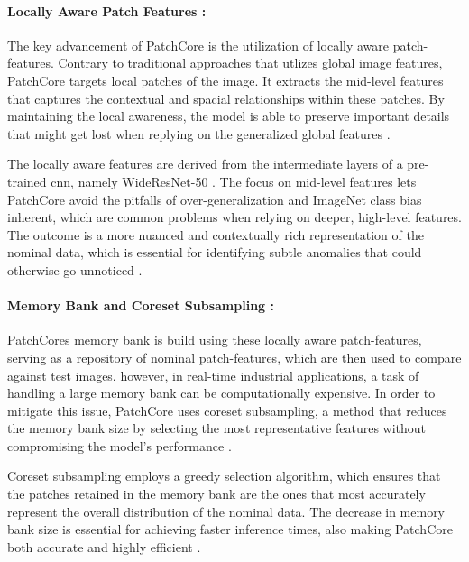 \paragraph*{Locally Aware Patch Features :} 
The key advancement of PatchCore is the utilization of locally aware patch-features. Contrary to traditional approaches that utlizes global image features, PatchCore targets local patches of the image. It extracts the mid-level features that captures the contextual and spacial relationships within these patches. By maintaining the local awareness, the model is able to preserve important details that might get lost when replying on the generalized global features \cite{roth2022totalrecallindustrialanomaly}.

The locally aware features are derived from the intermediate layers of a pre-trained \gls{cnn}, namely WideResNet-50 \cite{zagoruyko2017wideresidualnetworks}. The focus on mid-level features lets PatchCore avoid the pitfalls of over-generalization and ImageNet class bias inherent, which are common problems when relying on deeper, high-level features. The outcome is a more nuanced and contextually rich representation of the nominal data, which is essential for identifying subtle anomalies that could otherwise go unnoticed \cite{roth2022totalrecallindustrialanomaly}.

\paragraph*{Memory Bank and Coreset Subsampling :}

PatchCores memory bank is build using these locally aware patch-features, serving as a repository of nominal patch-features, which are then used to compare against test images. however, in real-time industrial applications, a task of handling a large memory bank can be computationally expensive. In order to mitigate this issue, PatchCore uses coreset subsampling, a method that reduces the memory bank size by selecting the most representative features without compromising the model's performance \cite{roth2022totalrecallindustrialanomaly}.

Coreset subsampling employs a greedy selection algorithm, which ensures that the patches retained in the memory bank are the ones that most accurately represent the overall distribution of the nominal data. The decrease in memory bank size is essential for achieving faster inference times, also making PatchCore both accurate and highly efficient \cite{roth2022totalrecallindustrialanomaly}.

